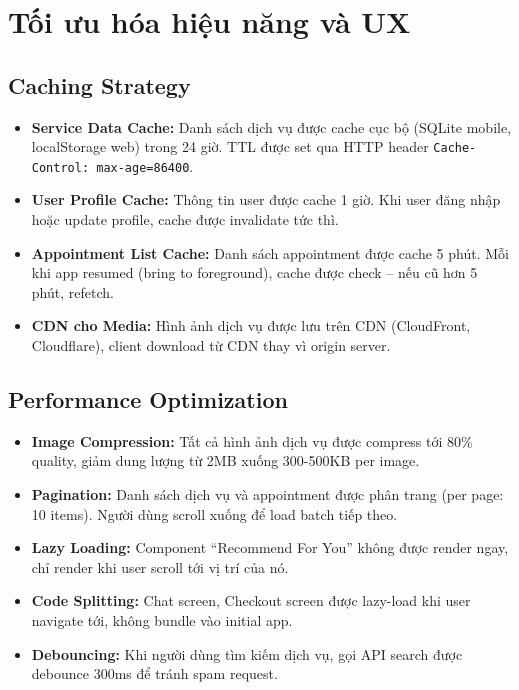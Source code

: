 \section{Tối ưu hóa hiệu năng và UX}

\subsection{Caching Strategy}

\begin{itemize}
    \item \textbf{Service Data Cache:} Danh sách dịch vụ được cache cục bộ (SQLite mobile, localStorage web) trong 24 giờ. TTL được set qua HTTP header \texttt{Cache-Control: max-age=86400}.
    
    \item \textbf{User Profile Cache:} Thông tin user được cache 1 giờ. Khi user đăng nhập hoặc update profile, cache được invalidate tức thì.
    
    \item \textbf{Appointment List Cache:} Danh sách appointment được cache 5 phút. Mỗi khi app resumed (bring to foreground), cache được check -- nếu cũ hơn 5 phút, refetch.
    
    \item \textbf{CDN cho Media:} Hình ảnh dịch vụ được lưu trên CDN (CloudFront, Cloudflare), client download từ CDN thay vì origin server.
\end{itemize}

\subsection{Performance Optimization}

\begin{itemize}
    \item \textbf{Image Compression:} Tất cả hình ảnh dịch vụ được compress tới 80\% quality, giảm dung lượng từ 2MB xuống 300-500KB per image.
    
    \item \textbf{Pagination:} Danh sách dịch vụ và appointment được phân trang (per page: 10 items). Người dùng scroll xuống để load batch tiếp theo.
    
    \item \textbf{Lazy Loading:} Component ``Recommend For You'' không được render ngay, chỉ render khi user scroll tới vị trí của nó.
    
    \item \textbf{Code Splitting:} Chat screen, Checkout screen được lazy-load khi user navigate tới, không bundle vào initial app.
    
    \item \textbf{Debouncing:} Khi người dùng tìm kiếm dịch vụ, gọi API search được debounce 300ms để tránh spam request.
\end{itemize}

